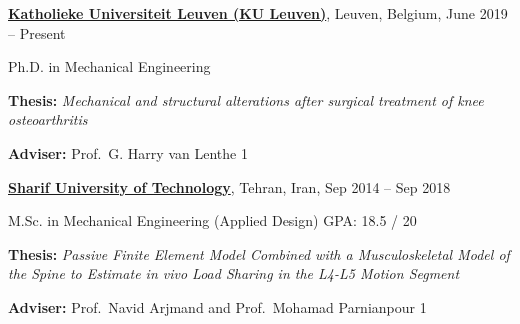 \documentclass[8pt]{article}
\newcommand{\halfblankline}{\quad\vspace{-0.5\baselineskip}\pagebreak[3]}
\def\longversion{1}  %
\begin{document}
\href{https://www.kuleuven.be/english/kuleuven}{\textbf{Katholieke Universiteit Leuven (KU Leuven)}}, Leuven, Belgium, {June 2019 -- Present}
\begin{innerlist}
\item[] Ph.D. in Mechanical Engineering \quad %
        \begin{innerlist}
        \item[] \textbf{Thesis:} \emph{Mechanical and structural alterations after surgical treatment of knee osteoarthritis}
        \item[] \textbf{Adviser:} Prof.~G. Harry van Lenthe
        \if\longversion1
        \fi
        \end{innerlist}

\end{innerlist}

\halfblankline

\href{http://www.en.sharif.edu/}{\textbf{Sharif University of Technology}}, Tehran, Iran, {Sep 2014 -- Sep 2018}
\begin{innerlist}
	\item[] M.Sc. in Mechanical Engineering (Applied Design) \quad  GPA: 18.5 / 20
	\begin{innerlist}
		\item[] \textbf{Thesis:} \emph{Passive Finite Element Model Combined with a Musculoskeletal Model of the Spine to Estimate in vivo Load Sharing in the
L4-L5 Motion Segment}
		\item[] \textbf{Adviser:} Prof.~Navid Arjmand and Prof.~Mohamad Parnianpour
		\if\longversion1
  
		\fi
	\end{innerlist}
	
\end{innerlist}

\halfblankline
\end{document}
